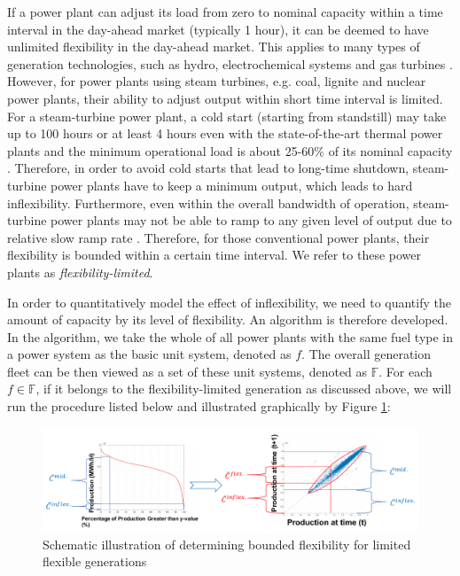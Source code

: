 If a power plant can adjust its load from zero to nominal capacity within a time interval in the day-ahead market (typically 1 hour), it can be deemed to have unlimited flexibility in the day-ahead market. This applies to many types of generation technologies, such as hydro, electrochemical systems and gas turbines \cite{Muller2016,AgoraEnergiewende2017,Siemens,GE}. However, for power plants using steam turbines, e.g. coal, lignite and nuclear power plants, their ability to adjust output within short time interval is limited. For a steam-turbine power plant, a cold start (starting from standstill) may take up to 100 hours or at least 4 hours even with the state-of-the-art thermal power plants \cite{Muller2016} and the minimum operational load is about 25-60\% of its nominal capacity \cite{AgoraEnergiewende2017}. Therefore, in order to avoid cold starts that lead to long-time shutdown, steam-turbine power plants have to keep a minimum output, which leads to hard inflexibility. Furthermore, even within the overall bandwidth of operation, steam-turbine power plants may not be able to ramp to any given level of output due to relative slow ramp rate \cite{Muller2016}. Therefore, for those conventional power plants, their flexibility is bounded within a certain time interval. We refer to these power plants as \textit{flexibility-limited}.

In order to quantitatively model the effect of inflexibility, we need to quantify the amount of capacity by its level of flexibility. An algorithm is therefore developed. In the algorithm, we take the whole of all power plants with the same fuel type in a power system as the basic unit system, denoted as $f$. The overall generation fleet can be then viewed as a set of these unit systems, denoted as $\mathbb{F}$. For each $f \in \mathbb{F}$, if it belongs to the flexibility-limited generation as discussed above, we will run the procedure listed below and illustrated graphically by Figure \ref{fig:bounded-flexibility}:

\begin{figure}[h!]
	\label{fig:bounded-flexibility}
	\includegraphics[width=1.05\linewidth]{Figures/BoundedFlexibility}
	\caption{Schematic illustration of determining bounded flexibility for limited flexible generations}
\end{figure}

